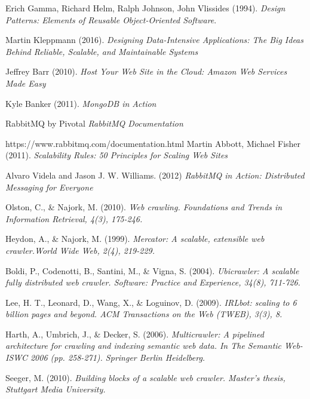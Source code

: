 \renewcommand{\bibname}{References}

\begin{thebibliography}{9}
Erich Gamma, Richard Helm, Ralph Johnson, John Vlissides (1994).
\textit{Design Patterns: Elements of Reusable Object-Oriented Software}.

Martin Kleppmann (2016).
\textit{Designing Data-Intensive Applications: The Big Ideas Behind Reliable, Scalable, and Maintainable Systems}

Jeffrey Barr (2010).
\textit{Host Your Web Site in the Cloud: Amazon Web Services Made Easy}

Kyle Banker (2011).
\textit{MongoDB in Action}

RabbitMQ by Pivotal
\textit{RabbitMQ Documentation}

https://www.rabbitmq.com/documentation.html
Martin Abbott, Michael Fisher (2011).
\textit{Scalability Rules: 50 Principles for Scaling Web Sites}

Alvaro Videla and Jason J. W. Williams. (2012)
\textit{RabbitMQ in Action: Distributed Messaging for Everyone}

Olston, C., \& Najork, M. (2010).
\textit{Web crawling. Foundations and Trends in Information Retrieval, 4(3), 175-246.}

Heydon, A., \& Najork, M. (1999).
\textit{Mercator: A scalable, extensible web crawler.World Wide Web, 2(4), 219-229.}

Boldi, P., Codenotti, B., Santini, M., \& Vigna, S. (2004).
\textit{Ubicrawler: A scalable fully distributed web crawler. Software: Practice and Experience, 34(8), 711-726.}

Lee, H. T., Leonard, D., Wang, X., \& Loguinov, D. (2009).
\textit{IRLbot: scaling to 6 billion pages and beyond. ACM Transactions on the Web (TWEB), 3(3), 8.}

Harth, A., Umbrich, J., \& Decker, S. (2006).
\textit{Multicrawler: A pipelined architecture for crawling and indexing semantic web data. In The Semantic Web-ISWC 2006 (pp. 258-271). Springer Berlin Heidelberg.}

Seeger, M. (2010).
\textit{Building blocks of a scalable web crawler. Master's thesis, Stuttgart Media University.}


\end{thebibliography}
